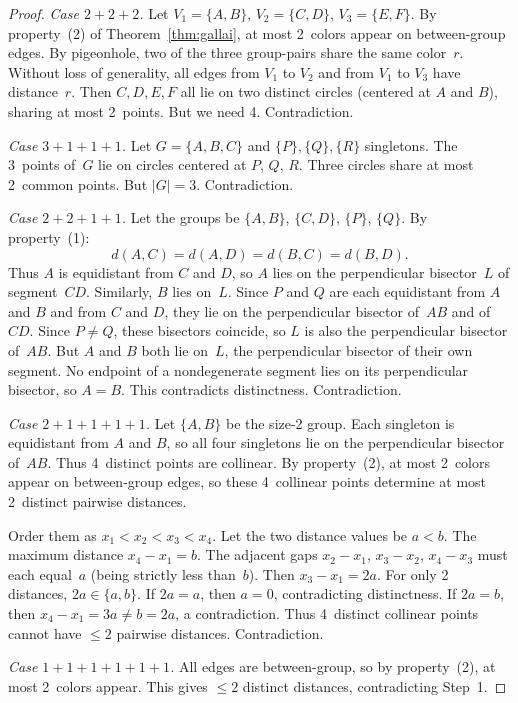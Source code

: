\documentclass[12pt]{amsart}
\theoremstyle{definition}
\begin{document}
\begin{proof}
\smallskip
\emph{Case $2+2+2$.} Let $V_1 = \{A,B\}$, $V_2 = \{C,D\}$, $V_3 = \{E,F\}$. By property~(2) of Theorem~\ref{thm:gallai}, at most 2~colors appear on between-group edges. By pigeonhole, two of the three group-pairs share the same color~$r$. Without loss of generality, all edges from $V_1$ to $V_2$ and from $V_1$ to $V_3$ have distance~$r$. Then $C,D,E,F$ all lie on two distinct circles (centered at $A$ and $B$), sharing at most 2~points. But we need 4. Contradiction.

\smallskip
\emph{Case $3+1+1+1$.} Let $G = \{A,B,C\}$ and $\{P\}, \{Q\}, \{R\}$ singletons. The 3~points of~$G$ lie on circles centered at $P$, $Q$, $R$. Three circles share at most 2~common points. But $|G| = 3$. Contradiction.

\smallskip
\emph{Case $2+2+1+1$.} Let the groups be $\{A,B\}$, $\{C,D\}$, $\{P\}$, $\{Q\}$. By property~(1):
\[
d(A,C) = d(A,D) = d(B,C) = d(B,D).
\]
Thus $A$ is equidistant from $C$ and $D$, so $A$ lies on the perpendicular bisector~$L$ of segment~$CD$. Similarly, $B$ lies on~$L$. Since $P$ and $Q$ are each equidistant from $A$ and $B$ and from $C$ and $D$, they lie on the perpendicular bisector of~$AB$ and of~$CD$. Since $P \neq Q$, these bisectors coincide, so $L$ is also the perpendicular bisector of~$AB$. But $A$ and $B$ both lie on~$L$, the perpendicular bisector of their own segment. No endpoint of a nondegenerate segment lies on its perpendicular bisector, so $A = B$. This contradicts distinctness. Contradiction.

\smallskip
\emph{Case $2+1+1+1+1$.} Let $\{A,B\}$ be the size-2 group. Each singleton is equidistant from $A$ and $B$, so all four singletons lie on the perpendicular bisector of~$AB$. Thus 4~distinct points are collinear. By property~(2), at most 2~colors appear on between-group edges, so these 4~collinear points determine at most 2~distinct pairwise distances.

Order them as $x_1 < x_2 < x_3 < x_4$. Let the two distance values be $a < b$. The maximum distance $x_4 - x_1 = b$. The adjacent gaps $x_2 - x_1$, $x_3 - x_2$, $x_4 - x_3$ must each equal~$a$ (being strictly less than~$b$). Then $x_3 - x_1 = 2a$. For only 2 distances, $2a \in \{a, b\}$. If $2a = a$, then $a = 0$, contradicting distinctness. If $2a = b$, then $x_4 - x_1 = 3a \neq b = 2a$, a contradiction. Thus 4~distinct collinear points cannot have $\leq 2$ pairwise distances. Contradiction.

\smallskip
\emph{Case $1+1+1+1+1+1$.} All edges are between-group, so by property~(2), at most 2~colors appear. This gives $\leq 2$ distinct distances, contradicting Step~1.


\end{proof}
\end{document}
